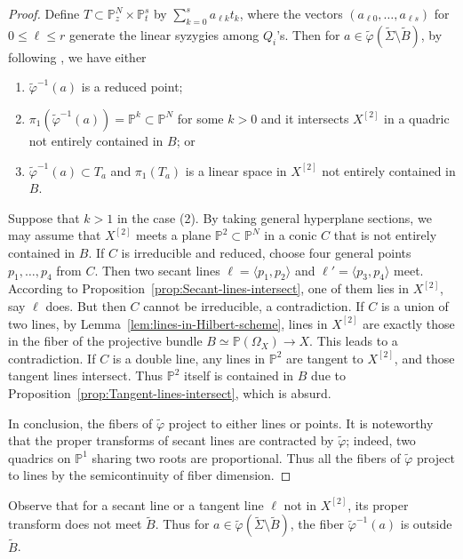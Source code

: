 \documentclass[a4paper]{amsart}
\numberwithin{equation}{section}
\theoremstyle{plain}
\theoremstyle{definition}
\theoremstyle{remark}
\numberwithin{figure}{section}
\numberwithin{table}{section}
\numberwithin{equation}{section}
\def \PP {\mathbb{P}}
\begin{document}
\begin{proof}
    Define $T \subset \PP_z^N \times \PP_t^s$ by $\sum_{k=0}^s a_{\ell k}t_k$, where the vectors $(a_{\ell 0}, \dots, a_{\ell s})$ for $0 \leq \ell \leq r$ generate the linear syzygies among $Q_i$'s.
    Then for $a \in \widetilde{\varphi}(\widetilde{\Sigma} \setminus \widetilde{B})$, by following \cite[Proposition~2.8]{Vermeire2001}, we have either
    \begin{enumerate}
        \item $\widetilde{\varphi}^{-1}(a)$ is a reduced point;
        \item $\pi_1(\widetilde{\varphi}^{-1}(a)) = \PP^k \subset \PP^N$ for some $k > 0$ and it intersects $X^{[2]}$ in a quadric not entirely contained in $B$; or
        \item $\widetilde{\varphi}^{-1}(a) \subset T_a$ and $\pi_1(T_a)$ is a linear space in $X^{[2]}$ not entirely contained in $B$.
    \end{enumerate}
    
    Suppose that $k > 1$ in the case (2).
    By taking general hyperplane sections, we may assume that $X^{[2]}$ meets a plane $\PP^2 \subset \PP^N$ in a conic $C$ that is not entirely contained in $B$.
    If $C$ is irreducible and reduced, choose four general points $p_1, \dots, p_4$ from $C$.
    Then two secant lines $\ell = \langle p_1, p_2 \rangle$ and $\ell' = \langle p_3, p_4 \rangle$ meet.
    According to Proposition~\ref{prop:Secant-lines-intersect}, one of them lies in $X^{[2]}$, say $\ell$ does.
    But then $C$ cannot be irreducible, a contradiction.
    If $C$ is a union of two lines, by Lemma~\ref{lem:lines-in-Hilbert-scheme}, lines in $X^{[2]}$ are exactly those in the fiber of the projective bundle $B\simeq \PP(\Omega_X) \rightarrow X$.
    This leads to a contradiction.
    If $C$ is a double line, any lines in $\PP^2$ are tangent to $X^{[2]}$, and those tangent lines intersect.
    Thus $\PP^2$ itself is contained in $B$ due to Proposition~\ref{prop:Tangent-lines-intersect}, which is absurd.
    
    In conclusion, the fibers of $\widetilde{\varphi}$ project to either lines or points.
    It is noteworthy that the proper transforms of secant lines are contracted by $\widetilde{\varphi}$; indeed, two quadrics on $\PP^1$ sharing two roots are proportional.
    Thus all the fibers of $\widetilde{\varphi}$ project to lines by the semicontinuity of fiber dimension.
\end{proof}

Observe that for a secant line or a tangent line $\ell$ not in $X^{[2]}$, its proper transform does not meet $\widetilde{B}$.
Thus for $a \in \widetilde{\varphi}(\widetilde{\Sigma} \setminus \widetilde{B})$, the fiber $\widetilde{\varphi}^{-1}(a)$ is outside $\widetilde{B}$.
\end{document}
